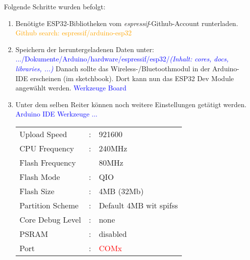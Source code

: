 Folgende Schritte wurden befolgt:
\begin{enumerate}
\item Benötigte ESP32-Bibliotheken vom \textit{espressif}-Github-Account runterladen.\cite{grokhotkov_espressifarduino-esp32_2020} \newline
\textcolor{orange}{Github search: espressif/arduino-esp32} \cite{grokhotkov_espressifarduino-esp32_2020}
\newline

\item Speichern der heruntergeladenen Daten unter:\newline
\textcolor{blue}{.../Dokumente/Arduino/hardware/espressif/esp32/\textit{(Inhalt: cores, docs, libraries, ...)}}\newline
Danach sollte das Wireless-/Bluetoothmodul in der Arduino-IDE erscheinen (im sketchbook). Dort kann nun das ESP32 Dev Module angewählt werden.\newline
\textcolor{blue} {Werkzeuge \textrightarrow Board}\newline
\item Unter dem selben Reiter können noch weitere Einstellungen getätigt werden.\newline
\textcolor{blue}{Arduino IDE \textrightarrow Werkzeuge \textrightarrow ...}\newline
\begin{tabular}{lll}
Upload Speed & : & 921600\\
CPU Frequency & : & 240MHz\\
Flash Frequency & & 80MHz\\
Flash Mode & : & QIO\\
Flash Size & : & 4MB (32Mb)\\
Partition Scheme & : & Default 4MB wit spifss\\
Core Debug Level & : & none\\
PSRAM & : & disabled\\
Port & : & \textcolor{red}{COMx}\\
\end{tabular}


\end{enumerate}
